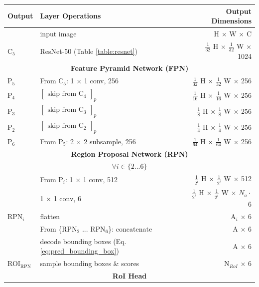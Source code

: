 {
\begin{longtable}{llr}
\toprule
\textbf{Output} & \textbf{Layer Operations} & \textbf{Output Dimensions} \\
\midrule\midrule
& input image & H $\times$ W $\times$ C \\
\midrule
C$_5$ & ResNet-50 (Table \ref{table:resnet})  & $\tfrac{1}{32}$ H $\times$ $\tfrac{1}{32}$ W $\times$ 1024 \\
\midrule
\multicolumn{3}{c}{\textbf{Feature Pyramid Network (FPN)}}\\
\midrule
P$_5$ & From C$_5$: 1 $\times$ 1 conv, 256 & $\tfrac{1}{32}$ H $\times$ $\tfrac{1}{32}$ W $\times$ 256 \\
P$_4$ & $\begin{bmatrix}\textrm{skip from C$_4$}\end{bmatrix}_p$ & $\tfrac{1}{16}$ H $\times$ $\tfrac{1}{16}$ W $\times$ 256 \\
P$_3$ & $\begin{bmatrix}\textrm{skip from C$_3$}\end{bmatrix}_p$ & $\tfrac{1}{8}$ H $\times$ $\tfrac{1}{8}$ W $\times$ 256 \\
P$_2$ & $\begin{bmatrix}\textrm{skip from C$_2$}\end{bmatrix}_p$ & $\tfrac{1}{4}$ H $\times$ $\tfrac{1}{4}$ W $\times$ 256 \\
P$_6$ & From P$_5$: 2 $\times$ 2 subsample, 256 & $\tfrac{1}{64}$ H $\times$ $\tfrac{1}{64}$ W $\times$ 256 \\
\midrule
\multicolumn{3}{c}{\textbf{Region Proposal Network (RPN)}}\\
\midrule
\multicolumn{3}{c}{$\forall i \in \{2...6\}$}\\
& From P$_i$: 1 $\times$ 1 conv, 512 & $\tfrac{1}{2^i}$ H $\times$ $\tfrac{1}{2^i}$ W $\times$ 512 \\
& 1 $\times$ 1 conv, 6 & $\tfrac{1}{2^i}$ H $\times$ $\tfrac{1}{2^i}$ W $\times$ $N_a \cdot$ 6 \\
RPN$_i$& flatten & A$_i$ $\times$ 6 \\
\midrule
& From \{RPN$_2$ ... RPN$_6$\}: concatenate & A $\times$ 6 \\
& decode bounding boxes (Eq. \ref{eq:pred_bounding_box}) & A $\times$ 6 \\
ROI$_{\mathrm{RPN}}$ & sample bounding boxes \& scores & N$_{RoI}$ $\times$ 6 \\
\midrule
\multicolumn{3}{c}{\textbf{RoI Head}}\\

\end{longtable}}

